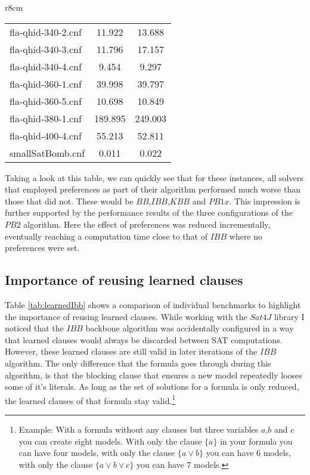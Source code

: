\begin{wraptable}[30]{r}{8cm}
\begin{tabular}{l| c c }
fla-qhid-340-2.cnf & 11.922 & 13.688 \\
fla-qhid-340-3.cnf & 11.796 & 17.157 \\
fla-qhid-340-4.cnf & 9.454 & 9.297 \\
fla-qhid-360-1.cnf & 39.998 & 39.797 \\
fla-qhid-360-5.cnf & 10.698 & 10.849 \\
fla-qhid-380-1.cnf & 189.895 & 249.003 \\
fla-qhid-400-4.cnf & 55.213 & 52.811 \\
smallSatBomb.cnf & 0.011 & 0.022 \\
\end{tabular}
\caption{Backbone computation time of the $IBB$ algorithm, once with keeping learned clauses ($t_{keep}$) and once discarding learned clauses between every sat call($t_{discard}$)}
\label{tab:learnedIbb} %
\end{wraptable} 
Taking a look at this table, we can quickly see that for these instances, all solvers that employed preferences as part of their algorithm performed much worse than those that did not. These would be $BB$,$IBB$,$KBB$ and $PB1x$. This impression is further supported by the performance results of the three configurations of the $PB2$ algorithm. Here the effect of preferences was reduced incrementally, eventually reaching a computation time close to that of $IBB$ where no preferences were set.



\subsection{Importance of reusing learned clauses}
Table \ref{tab:learnedIbb} shows a comparison of individual benchmarks to highlight the importance of reusing learned clauses. While working with the $Sat4J$ library I noticed that the $IBB$ backbone algorithm was accidentally configured in a way that learned clauses would always be discarded between SAT computations. However, these learned clauses are still valid in later iterations of the $IBB$ algorithm. The only difference that the formula goes through during this algorithm, is that the blocking clause that ensures a new model repeatedly looses some of it's literals. As long as the set of solutions for a formula is only reduced, the learned clauses of that formula stay valid.\footnote{Example: With a formula without any clauses but three variables $a$,$b$ and $c$ you can create eight models. With only the clause $\{a\}$ in your formula you can have four models, with only the clause $\{a \lor b\}$ you can have 6 models, with only the clause $\{a\lor b \lor c\}$ you can have 7 models.}

